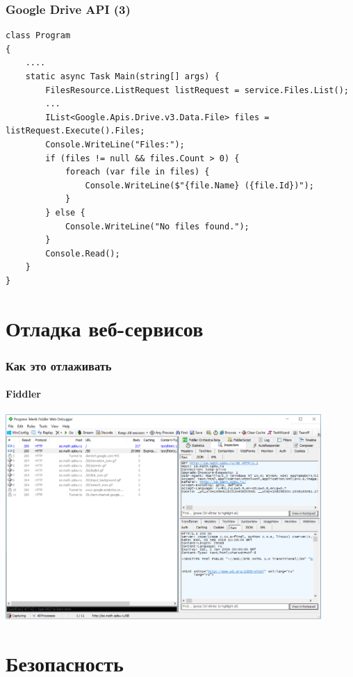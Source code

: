 \documentclass[xetex,mathserif,serif]{beamer}
\begin{document}
    \begin{frame}[fragile]
        \frametitle{Google Drive API (3)}
        \begin{scriptsize}
            \begin{verbatim}
class Program
{
    ....
    static async Task Main(string[] args) {
        FilesResource.ListRequest listRequest = service.Files.List();
        ...
        IList<Google.Apis.Drive.v3.Data.File> files = listRequest.Execute().Files;
        Console.WriteLine("Files:");
        if (files != null && files.Count > 0) {
            foreach (var file in files) {
                Console.WriteLine($"{file.Name} ({file.Id})");
            }
        } else {
            Console.WriteLine("No files found.");
        }
        Console.Read();
    }
}
            \end{verbatim}
        \end{scriptsize}
    \end{frame}

    \section{Отладка веб-сервисов}

    \begin{frame}
        \frametitle{Как это отлаживать}
        \framesubtitle{Fiddler}
        \begin{center}
            \includegraphics[width=0.9\textwidth]{fiddler.png}
        \end{center}
    \end{frame}

    \section{Безопасность}
\end{document}
